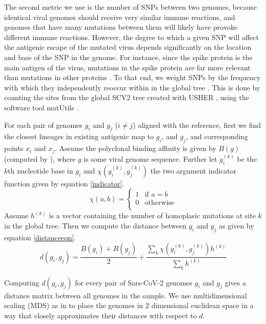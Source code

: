 \documentclass{article}
\begin{document}
The second metric we use is the number of SNPs between two genomes, because identical viral genomes should receive very similar immune reactions, and genomes that have many mutations between them will likely have provoke different immune reactions.
However, the degree to which a given SNP will affect the antigenic escape of the mutated virus depends significantly on the location and base of the SNP in the genome. 
For instance, since the spike protein is the main antigen of the virus, mutations in the spike protein are far more relevant than mutations in other proteins \cite{harvey2021sars}.
To that end, we weight SNPs by the frequency with which they independently reoccur within in the global tree \cite{attwood2022phylogenetic}.
This is done by counting the  sites from the global SCV2 tree created with USHER \cite{turakhia2021ultrafast}, using the software tool matUtils \cite{mcbroome2021matutils}.

For each pair of genomes $g_i$ and $g_j$ ($i\neq j$) aligned with the reference, first we find the closest lineages in existing antigenic map to $g_i$, and $g_j$, and corresponding points $x_i$ and $x_j$. Assume the polyclonal binding affinity is given by $B(g)$ (computed by \cite{greaney2022antibody}), where $g$ is some viral genome sequence. Further let $g_i^{(k)}$ be the $k$th nucleotide base in $g_i$ and $\chi(g_i^{(k)},g_j^{(k)})$ the two argument indicator function given by equation \ref{indicator}.
\begin{equation}
        \chi(a,b) =   \begin{cases}
        1 & \text{if $a = b$} \\
        0 & \text{otherwise} \\
    \end{cases}
    \label{indicator}
\end{equation}
Assume $h^{(k)}$ is a vector containing the number of homoplasic mutations at site $k$ in the global tree.
Then we compute the distance between $g_i$ and $g_j$ as given by equation \ref{distanceeqn}.
\begin{equation}
    d(g_i,g_j) = \frac{B(g_i) + B(g_j)}{2} + \frac{\sum_k \chi\left(g_i^{(k)},g_j^{(k)}\right) h^{(k)}}{\sum_k h^{(k)}}
    \label{distanceeqn}
\end{equation}

Computing $d(g_i, g_j)$ for every pair of Sars-CoV-2 genomes $g_i$ and $g_j$ gives a distance matrix between all genomes in the sample.
We use multidimensional scaling (MDS) as in \cite{wilksMappingSARSCoV2Antigenic2022, lapedesGeometryShapeSpace2001} to place the genomes in 2 dimensional euclidean space in a way that closely approximates their distances with respect to $d$.
\end{document}
